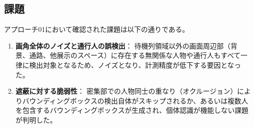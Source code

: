 \subsection{課題}
アプローチ01において確認された課題は以下の通りである。

\begin{enumerate}
    \item \textbf{画角全体のノイズと通行人の誤検出}：
    待機列領域以外の画面周辺部（背景、通路、他展示のスペース）に存在する無関係な人物や通行人もすべて一律に検出対象となるため、ノイズとなり、計測精度が低下する要因となった。
    \item \textbf{遮蔽に対する脆弱性}：
    密集部での人物同士の重なり（オクルージョン）によりバウンディングボックスの検出自体がスキップされるか、あるいは複数人を包含するバウンディングボックスが生成され、個体認識が機能しない課題が判明した。
\end{enumerate}

\clearpage
